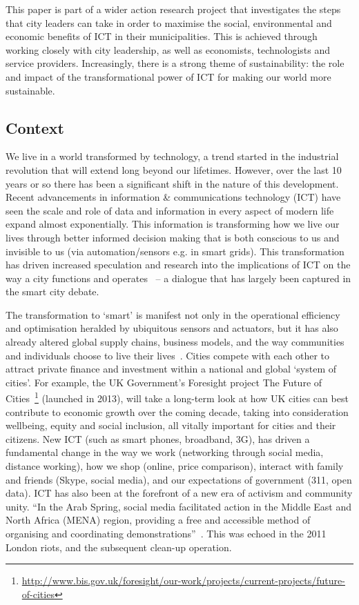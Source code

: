 \documentclass[conference]{IEEEtran}
\begin{document}
This paper is part of a wider action research project that
investigates the steps that city leaders can take in order to maximise
the social, environmental and economic benefits of ICT in their
municipalities. This is achieved through working closely with city
leadership, as well as economists, technologists and service
providers. Increasingly, there is a strong theme of sustainability: the
role and impact of the transformational power of ICT for making our
world more sustainable.


\subsection{Context}
We live in a world transformed by technology, a trend started in the
industrial revolution that will extend long beyond our
lifetimes. However, over the last 10 years or so there has been a
significant shift in the nature of this development. Recent
advancements in information \& communications technology (ICT) have
seen the scale and role of data and information in every aspect of
modern life expand almost exponentially. This information is
transforming how we live our lives through better informed decision
making that is both conscious to us and invisible to us (via
automation/sensors e.g. in smart grids). This transformation has
driven increased speculation and research into the implications of ICT
on the way a city functions and operates~\cite{odensaal:2003} -- a
dialogue that has largely been captured in the smart city debate.

The transformation to `smart' is manifest not only in the operational
efficiency and optimisation heralded by ubiquitous sensors and
actuators, but it has also already altered global supply chains,
business models, and the way communities and individuals choose to
live their lives~\cite{komninos:2002}. Cities compete with each other
to attract private finance and investment within a national and global
`system of cities'. For example, the UK Government's Foresight project
The Future of
Cities~\footnote{\url{http://www.bis.gov.uk/foresight/our-work/projects/current-projects/future-of-cities}}
(launched in 2013), will take a long-term look at how UK cities can
best contribute to economic growth over the coming decade, taking into
consideration wellbeing, equity and social inclusion, all vitally
important for cities and their citizens. New ICT (such as smart
phones, broadband, 3G), has driven a fundamental change in the way we
work (networking through social media, distance working), how we shop
(online, price comparison), interact with family and friends (Skype,
social media), and our expectations of government (311, open
data). ICT has also been at the forefront of a new era of activism and
community unity. ``In the Arab Spring, social media facilitated action
in the Middle East and North Africa (MENA) region, providing a free
and accessible method of organising and coordinating
demonstrations''~\cite{bright:2011}. This was echoed in the 2011
London riots, and the subsequent clean-up operation.
\end{document}

